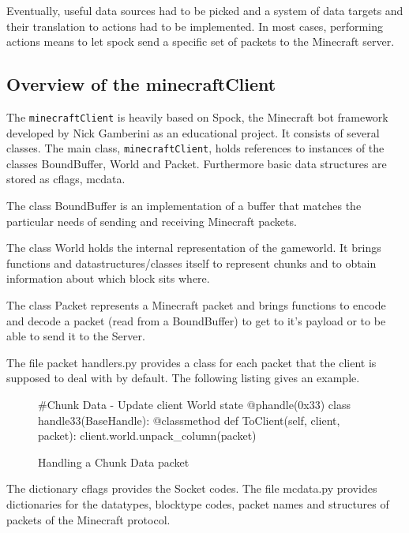 Eventually, useful data sources had to be picked and a system of data targets and their translation to actions had to be implemented. In most cases, performing actions means to let spock send a specific set of packets to the Minecraft server.

        \subsection{Overview of the minecraftClient}
The \texttt{minecraftClient} is heavily based on Spock, the Minecraft bot framework developed by Nick Gamberini as an educational project. It consists of several classes. The main class, \texttt{minecraftClient}, holds references to instances of the classes BoundBuffer,  World and Packet. Furthermore basic data structures are stored as cflags, mcdata.

The class BoundBuffer is an implementation of a buffer that matches the particular needs of sending and receiving Minecraft packets.

The class World holds the internal representation of the gameworld. It brings functions and datastructures/classes itself to represent chunks and to obtain information about which block sits where.

The class Packet represents a Minecraft packet and brings functions to encode and decode a packet (read from a BoundBuffer) to get to it's payload or to be able to send it to the Server.

The file packet handlers.py provides a class for each packet that the client is supposed to deal with by default. The following listing gives an example. %


		\begin{figure}[ht]
			\centering
			\begin{minipage}{11cm}
				\begin{pseudocode}
#Chunk Data - Update client World state
@phandle(0x33)
class handle33(BaseHandle):
	@classmethod
	def ToClient(self, client, packet):
		client.world.unpack_column(packet)
					\end{pseudocode}
				\caption{Handling a Chunk Data packet}
				\label{packet_handling}
			\end{minipage}
		\end{figure}

The dictionary cflags provides the Socket codes.
The file mcdata.py provides dictionaries for the datatypes, blocktype codes, packet names and structures of packets of the Minecraft protocol.

